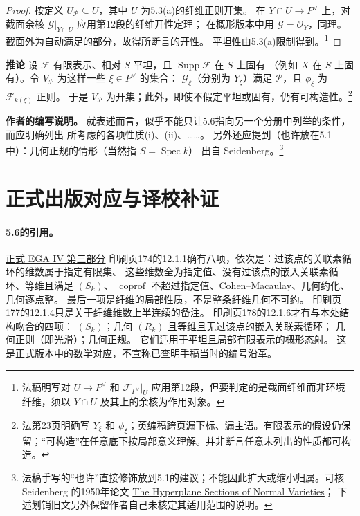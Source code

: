 \documentclass[openany,fontset=fandol]{ctexbook}
\DeclareMathOperator{\Spec}{Spec}
\DeclareMathOperator{\Supp}{Supp}
\DeclareMathOperator{\coprof}{coprof}
\newcommand{\OO}{\mathcal O}
\newcommand{\FF}{\mathcal F}
\newcommand{\GG}{\mathcal G}
\newcommand{\calP}{\mathcal P}
\newcommand{\tagitem}[2]{\par\medskip\noindent\textbf{#1\quad #2}\enspace}
\begin{document}
\begin{proof}
按定义 $U_{\calP}\subseteq U$，其中 $U$ 为5.3(a)的纤维正则开集。
在 $Y\cap U\to P^\vee$ 上，对截面余核 $\GG|_{Y\cap U}$ 应用第12段的纤维开性定理；
在概形版本中用 $\GG=\OO_Y$，同理。截面外为自动满足的部分，故得所断言的开性。
平坦性由5.3(a)限制得到。\footnote{法稿明写对 $U\to P^\vee$ 和 $\FF_{P^\vee}|_U$ 应用第12段，但要判定的是截面纤维而非环境纤维，须以 $Y\cap U$ 及其上的余核为作用对象。}
\end{proof}

\tagitem{推论}{5.7}
设 $\FF$ 有限表示、相对 $S$ 平坦，且 $\Supp\FF$ 在 $S$ 上固有
（例如 $X$ 在 $S$ 上固有）。令 $V_{\calP}$ 为这样一些 $\xi\in P^\vee$ 的集合：
$\GG_\xi$（分别为 $Y_\xi$）满足 $\calP$，且 $\phi_\xi$ 为 $\FF_{k(\xi)}$-正则。
于是 $V_{\calP}$ 为开集；此外，即使不假定平坦或固有，仍有可构造性。\footnote{法第23页明确写 $Y_\xi$ 和 $\phi_\xi$；英编稿跨页漏下标、漏主语。有限表示的假设仍保留；“可构造”在任意底下按局部意义理解。并非断言任意未列出的性质都可构造。}

\noindent\textbf{作者的编写说明。}
就表述而言，似乎不能只让5.6指向另一个分册中列举的条件，而应明确列出
所考虑的各项性质(i)、(ii)、……。
另外还应提到（也许放在5.1中）：几何正规的情形（当然指 $S=\Spec k$）
出自 Seidenberg。\footnote{法稿手写的“也许”直接修饰放到5.1的建议；不能因此扩大或缩小归属。可核 Seidenberg 的1950年论文
\href{https://doi.org/10.1090/S0002-9947-1950-0037548-0}{The Hyperplane Sections of Normal Varieties}；
下述划销旧文另外保留作者自己未核定其适用范围的说明。}

\section*{正式出版对应与译校补证}
\paragraph{5.6的引用。}
\href{https://www.numdam.org/item/PMIHES_1966__28__5_0/}{正式 EGA IV 第三部分}
印刷页174的12.1.1确有八项，依次是：过该点的关联素循环的维数属于指定有限集、
这些维数全为指定值、没有过该点的嵌入关联素循环、等维且满足 $(S_k)$、
$\coprof$ 不超过指定值、Cohen--Macaulay、几何约化、几何逐点整。
最后一项是纤维的局部性质，不是整条纤维几何不可约。
印刷页177的12.1.4只是关于纤维维数上半连续的备注。
印刷页178的12.1.6才有与本处结构吻合的四项：
$(S_k)$；几何 $(R_k)$ 且等维且无过该点的嵌入关联素循环；
几何正则（即光滑）；几何正规。
它们适用于平坦且局部有限表示的概形态射。
这是正式版本中的数学对应，不宣称已查明手稿当时的编号沿革。
\end{document}
